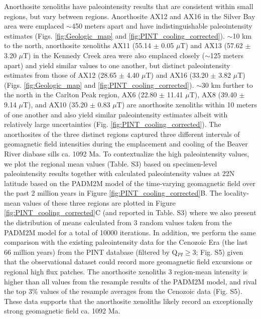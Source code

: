 \documentclass[9pt,twocolumn,twoside,lineno]{pnas-new}
\begin{document}
Anorthosite xenoliths have paleointensity results that are consistent within small regions, but vary between regions. Anorthosite AX12 and AX16 in the Silver Bay area were emplaced $\sim$450 meters apart and have indistinguishable paleointensity estimates (Figs. \ref{fig:Geologic_map} and \ref{fig:PINT_cooling_corrected}). $\sim$10 km to the north, anorthosite xenoliths AX11 (55.14 $\pm$ 0.05 $\mu$T) and AX13 (57.62 $\pm$ 3.20 $\mu$T) in the Kennedy Creek area were also emplaced closely ($\sim$125 meters apart) and yield similar values to one another, but distinct paleointensity estimates from those of AX12 (28.65 $\pm$ 4.40 $\mu$T) and AX16 (33.20 $\pm$ 3.82 $\mu$T) (Figs. \ref{fig:Geologic_map} and \ref{fig:PINT_cooling_corrected}). $\sim$30 km further to the north in the Carlton Peak region, AX6 (22.80 $\pm$ 11.41 $\mu$T), AX8 (39.40 $\pm$ 9.14 $\mu$T), and AX10 (35.20 $\pm$ 0.83 $\mu$T) are anorthosite xenoliths within 10 meters of one another and also yield similar paleointensity estimates albeit with relatively large uncertainties (Fig. \ref{fig:PINT_cooling_corrected}). The anorthosites of the three distinct regions captured three different intervals of geomagnetic field intensities during the emplacement and cooling of the Beaver River diabase sills ca. 1092 Ma. To contextualize the high paleointensity values, we plot the regional mean values (Table. S3) based on specimen-level paleointensity results together with calculated paleointensity values at 22\textdegree N latitude based on the PADM2M model of the time-varying geomagnetic field over the past 2 million years \cite{Ziegler2011a} in Figure \ref{fig:PINT_cooling_corrected}B. The locality-mean values of these three regions are plotted in Figure \ref{fig:PINT_cooling_corrected}C (and reported in Table. S3) where we also present the distribution of means calculated from 3 random values taken from the PADM2M model for a total of 10000 iterations. In addition, we perform the same comparison with the existing paleointensity data for the Cenozoic Era (the last 66 million years) from the PINT database (filtered by Q$_{PI}\geq$3; Fig. S5) given that the observational dataset could record more geomagnetic field excursions or regional high flux patches. The anorthosite xenoliths 3 region-mean intensity is higher than all values from the resample results of the PADM2M model, and rival the top 3\% values of the resample averages from the Cenozoic data (Fig. S5). These data supports that the anorthosite xenoliths likely record an exceptionally strong geomagnetic field ca. 1092 Ma.
\end{document}
